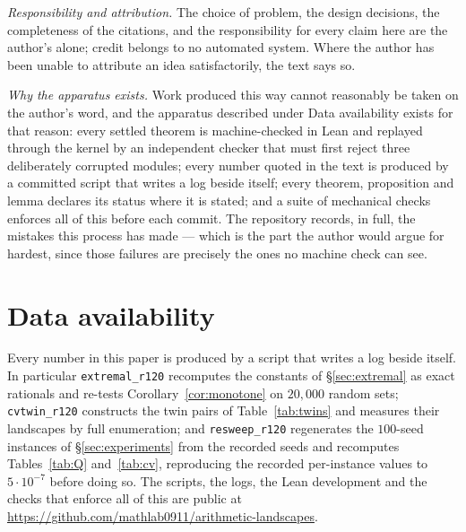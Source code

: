 \documentclass[11pt,a4paper]{article}
\theoremstyle{plain}
\theoremstyle{definition}
\theoremstyle{remark}
\begin{document}
\emph{Responsibility and attribution.} The choice of problem, the design decisions, the
completeness of the citations, and the responsibility for every claim here are the author's
alone; credit belongs to no automated system. Where the author has been unable to attribute an
idea satisfactorily, the text says so.

\emph{Why the apparatus exists.} Work produced this way cannot reasonably be taken on the
author's word, and the apparatus described under Data availability exists for that reason:
every settled theorem is machine-checked in Lean and replayed through the kernel by an
independent checker that must first reject three deliberately corrupted modules; every number
quoted in the text is produced by a committed script that writes a log beside itself; every
theorem, proposition and lemma declares its status where it is stated; and a suite of
mechanical checks enforces all of this before each commit. The repository records, in full, the
mistakes this process has made --- which is the part the author would argue for hardest, since
those failures are precisely the ones no machine check can see.

\section*{Data availability}
Every number in this paper is produced by a script that writes a log beside
itself. In particular \texttt{extremal\_r120} recomputes the constants of
\S\ref{sec:extremal} as exact rationals and re-tests
Corollary~\ref{cor:monotone} on $20{,}000$ random sets;
\texttt{cvtwin\_r120} constructs the twin pairs of Table~\ref{tab:twins} and
measures their landscapes by full enumeration; and \texttt{resweep\_r120}
regenerates the $100$-seed instances of \S\ref{sec:experiments} from the
recorded seeds and recomputes Tables~\ref{tab:Q} and~\ref{tab:cv}, reproducing
the recorded per-instance values to $5\cdot10^{-7}$ before doing so. The scripts, the logs, the Lean
development and the checks that enforce all of this are public at
\url{https://github.com/mathlab0911/arithmetic-landscapes}.
\end{document}
